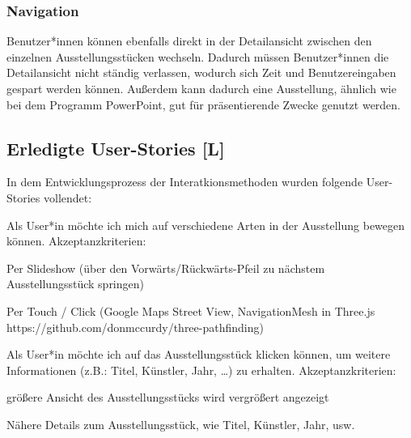 \subsubsection{Navigation}
Benutzer*innen können ebenfalls direkt in der Detailansicht zwischen den einzelnen Ausstellungsstücken wechseln. Dadurch müssen Benutzer*innen die Detailansicht nicht ständig verlassen, wodurch sich Zeit und Benutzereingaben gespart werden können. Außerdem kann dadurch eine Ausstellung, ähnlich wie bei dem Programm PowerPoint, gut für präsentierende Zwecke genutzt werden. 



\subsection{Erledigte User-Stories [L]}
In dem Entwicklungsprozess der Interatkionsmethoden wurden folgende User-Stories vollendet:

\begin{compactenum}       
  \item Als User*in möchte ich mich auf verschiedene Arten in der Ausstellung bewegen können. Akzeptanzkriterien:
  \begin{compactitem}
      \item Per Slideshow (über den Vorwärts/Rückwärts-Pfeil zu nächstem Ausstellungsstück springen)
      \item Per Touch / Click (Google Maps Street View, NavigationMesh in Three.js https://github.com/donmccurdy/three-pathfinding)
  \end{compactitem}
  \item  Als User*in möchte ich auf das Ausstellungsstück klicken können, um weitere Informationen (z.B.: Titel, Künstler, Jahr, …) zu erhalten. Akzeptanzkriterien:
  \begin{compactitem}
      \item größere Ansicht des Ausstellungsstücks wird vergrößert angezeigt
      \item Nähere Details zum Ausstellungsstück, wie Titel, Künstler, Jahr, usw.
  \end{compactitem}
\end{compactenum}